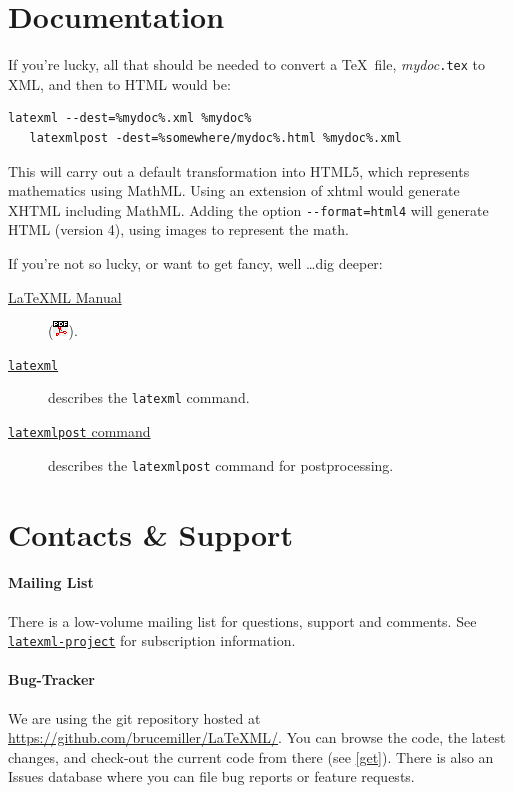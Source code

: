 \documentclass{article}
\newcommand{\PDFIcon}{\includegraphics{pdf}}
\begin{document}
\section{Documentation}\label{docs}
If you're lucky, all that should be needed to convert
a \TeX\ file, \textit{mydoc}\texttt{.tex} to XML, and
then to HTML would be:
\begin{lstlisting}[style=shell]
   latexml --dest=%mydoc%.xml %mydoc%
   latexmlpost -dest=%somewhere/mydoc%.html %mydoc%.xml
\end{lstlisting}
This will carry out a default transformation into HTML5,
which represents mathematics using MathML.  Using an
extension of xhtml would generate XHTML including MathML.
Adding the option \verb|--format=html4| will generate
HTML (version 4), using images to represent the math.

If you're not so lucky, or want to get fancy, well \ldots dig deeper:
\begin{description}
\item[\href{manual/}{LaTeXML Manual}] (\href{manual.pdf}{\PDFIcon}).
\item[\href{manual/commands/latexml.html}{\texttt{latexml}}]
    describes the \texttt{latexml} command.
\item[\href{manual/commands/latexmlpost.html}{\texttt{latexmlpost} command}]
   describes the \texttt{latexmlpost} command for postprocessing.
\end{description}


\section{Contacts \& Support}\label{contact}

\paragraph{Mailing List}\label{contact.list}
There is a low-volume mailing list for questions, support and comments.
See \href{http://lists.jacobs-university.de/mailman/listinfo/project-latexml}{\texttt{latexml-project}} for subscription information.


\paragraph{Bug-Tracker}\label{contact.git}
We are using the git repository hosted at
\href{https://github.com/brucemiller/LaTeXML/}{https://github.com/brucemiller/LaTeXML/}.
You can browse the code, the latest changes, and check-out the current code from
there (see \ref{get}).  There is also an Issues database where you can
file bug reports or feature requests.
\end{document}
